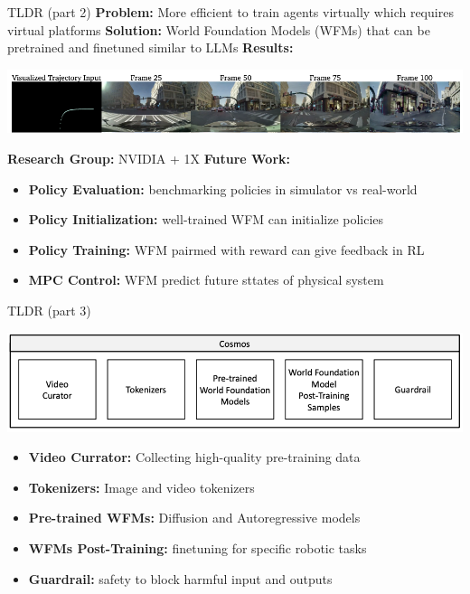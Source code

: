 \documentclass{beamer}
\begin{document}
\begin{frame}[t]{TLDR (part 2)}
    \textbf{Problem:} More efficient to train agents virtually which requires virtual platforms \newline
    \textbf{Solution:} World Foundation Models (WFMs) that can be pretrained and finetuned similar to LLMs\newline
    \textbf{Results:} 
    \begin{center}
        \includegraphics[width=\textwidth]{./img/tldr_1.png}
    \end{center} 
    \textbf{Research Group:} NVIDIA + 1X\newline \pause
    \textbf{Future Work:}
    \small
    \begin{itemize}[label=-]
        \item \textbf{Policy Evaluation:} benchmarking policies in simulator vs real-world
        \item \textbf{Policy Initialization:} well-trained WFM can initialize policies 
        \item \textbf{Policy Training:} WFM pairmed with reward can give feedback in RL
        \item \textbf{MPC Control:} WFM predict future sttates of physical system
    \end{itemize}
    \normalsize
\end{frame}


\begin{frame}[t]{TLDR (part 3)}
    \begin{center}
        \includegraphics[width=\textwidth]{./img/tldr_3.png}
    \end{center} 
    \small
    \begin{itemize}[label=-]
        \item \textbf{Video Currator:} Collecting high-quality pre-training data
        \item \textbf{Tokenizers:} Image and video tokenizers
        \item \textbf{Pre-trained WFMs:} Diffusion and Autoregressive models
        \item \textbf{WFMs Post-Training:} finetuning for specific robotic tasks
        \item \textbf{Guardrail:} safety to block harmful input and outputs
    \end{itemize}
    \normalsize
\end{frame}
\end{document}
